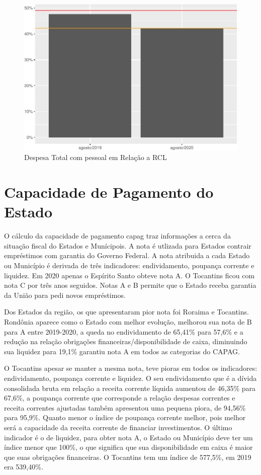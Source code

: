 \begin{figure}[h]
\caption{Despesa Total com pessoal em Relação a RCL}
\includegraphics[width=\linewidth]{fig/unnamed-chunk-8-1.pdf}
\end{figure}

\section{Capacidade de Pagamento do
Estado}
O cálculo da capacidade de pagamento \acrshort{capag} traz informações a cerca da
situação fiscal do Estados e Munícipois. A nota é utlizada para Estados
contrair empréstimos com garantia do Governo Federal. A nota atribuida a
cada Estado ou Município é derivada de três indicadores: endividamento,
poupança corrente e liquidez. Em 2020 apenas o Espírito Santo obteve
nota A. O Tocantins ficou com nota C por três anos seguidos. Notas A e B
permite que o Estado receba garantia da União para pedi novos
empréstimos.

Dos Estados da região, os que apresentaram pior nota foi Roraima e
Tocantins. Rondônia aparece como o Estado com melhor evolução, melhorou
sua nota de B para A entre 2019-2020, a queda no endividamento de
65,41\% para 57,6\% e a redução na relação obrigações
financeiras/disponibilidade de caixa, diminuindo sua liquidez para
19,1\% garantiu nota A em todos as categorias do CAPAG.

O Tocantins apesar se manter a mesma nota, teve pioras em todos os
indicadores: endividamento, poupança corrente e liquidez. O seu
endividamento que é a dívida consolidada bruta em relação a receita
corrente líquida aumentou de 46,35\% para 67,6\%, a poupança corrente
que corresponde a relação despesas correntes e receita correntes
ajustadas também apresentou uma pequena piora, de 94,56\% para 95,9\%.
Quanto menor o índice de poupança corrente melhor, pois melhor será a
capacidade da receita corrente de financiar investimentos. O último
indicador é o de liquidez, para obter nota A, o Estado ou Município deve
ter um índice menor que 100\%, o que significa que sua disponibilidade
em caixa é maior que suas obrigações financeiras. O Tocantins tem um
índice de 577,5\%, em 2019 era 539,40\%.

